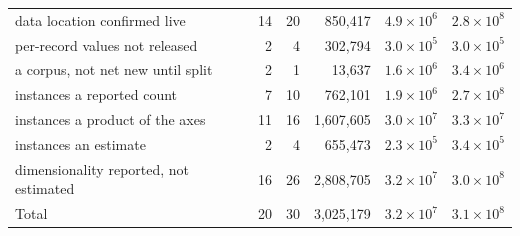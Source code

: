 \begin{table}[H]
\begin{tabular}{@{}l r r r r r@{}}
data location confirmed live & 14 & 20 & 850,417 & $4.9\times 10^{6}$ & $2.8\times 10^{8}$ \\
per-record values not released & 2 & 4 & 302,794 & $3.0\times 10^{5}$ & $3.0\times 10^{5}$ \\
a corpus, not net new until split & 2 & 1 & 13,637 & $1.6\times 10^{6}$ & $3.4\times 10^{6}$ \\
instances a reported count & 7 & 10 & 762,101 & $1.9\times 10^{6}$ & $2.7\times 10^{8}$ \\
instances a product of the axes & 11 & 16 & 1,607,605 & $3.0\times 10^{7}$ & $3.3\times 10^{7}$ \\
instances an estimate & 2 & 4 & 655,473 & $2.3\times 10^{5}$ & $3.4\times 10^{5}$ \\
dimensionality reported, not estimated & 16 & 26 & 2,808,705 & $3.2\times 10^{7}$ & $3.0\times 10^{8}$ \\
\midrule
Total & 20 & 30 & 3,025,179 & $3.2\times 10^{7}$ & $3.1\times 10^{8}$ \\
\bottomrule
\end{tabular}
\end{table}
